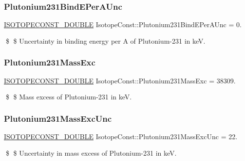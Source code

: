 \subsubsection{\texorpdfstring{Plutonium231\+Bind\+E\+Per\+A\+Unc}{Plutonium231BindEPerAUnc}}
{\footnotesize\ttfamily \mbox{\hyperlink{group___isotope_const-_macros_ga8f45a7272ce02c0b4c65c44636ed719a}{I\+S\+O\+T\+O\+P\+E\+C\+O\+N\+S\+T\+\_\+\+D\+O\+U\+B\+LE}} Isotope\+Const\+::\+Plutonium231\+Bind\+E\+Per\+A\+Unc = 0.}

\$ \$ Uncertainty in binding energy per A of Plutonium-\/231 in keV. \mbox{\label{group___isotope_const-_plutonium-_pu231_ga4da38563764453c30e85299ac2dbc31a}} 
\subsubsection{\texorpdfstring{Plutonium231\+Mass\+Exc}{Plutonium231MassExc}}
{\footnotesize\ttfamily \mbox{\hyperlink{group___isotope_const-_macros_ga8f45a7272ce02c0b4c65c44636ed719a}{I\+S\+O\+T\+O\+P\+E\+C\+O\+N\+S\+T\+\_\+\+D\+O\+U\+B\+LE}} Isotope\+Const\+::\+Plutonium231\+Mass\+Exc = 38309.}

\$ \$ Mass excess of Plutonium-\/231 in keV. \mbox{\label{group___isotope_const-_plutonium-_pu231_gae15fa35d0c3dbf3dba77d19f52a30374}} 
\subsubsection{\texorpdfstring{Plutonium231\+Mass\+Exc\+Unc}{Plutonium231MassExcUnc}}
{\footnotesize\ttfamily \mbox{\hyperlink{group___isotope_const-_macros_ga8f45a7272ce02c0b4c65c44636ed719a}{I\+S\+O\+T\+O\+P\+E\+C\+O\+N\+S\+T\+\_\+\+D\+O\+U\+B\+LE}} Isotope\+Const\+::\+Plutonium231\+Mass\+Exc\+Unc = 22.}

\$ \$ Uncertainty in mass excess of Plutonium-\/231 in keV. \mbox{\label{group___isotope_const-_plutonium-_pu231_ga4eaefbdcf9e3532ec44fe604f2233e9a}} 
